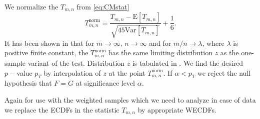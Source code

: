 We normalize the $T_{m,n}$ from \ref{eq:CMstat}
\begin{equation}
T_{m,n}^\mathrm{norm} = \frac{T_{m,n}-\mathrm{E}[T_{m,n}]}{\sqrt{45\mathrm{Var}[T_{m,n}]}} + \frac{1}{6}.
\end{equation}
It has been shown in \cite{Rosenblatt1952} that for $m \rightarrow \infty$, $n \rightarrow \infty$ and for ${m}/{n} \rightarrow \lambda$, where $\lambda$ is positive finite constant, the  $T_{m,n}^\mathrm{norm}$ has the same limiting distribution $z$ as the one-sample variant of the test. Distribution $z$ is tabulated  in \cite{AndersonDarling1952}. We find the desired $p-$value $p_T$ by interpolation of $z$ at the point $T_{m,n}^\mathrm{norm}$. If $\alpha < p_T$ we reject the null hypothesis that $F = G $ at significance level $\alpha$.

Again for use with the weighted samples which we need to analyze in case of \dzero data we replace the ECDFs in the statistic $T_{m,n}$ by appropriate WECDFs.

